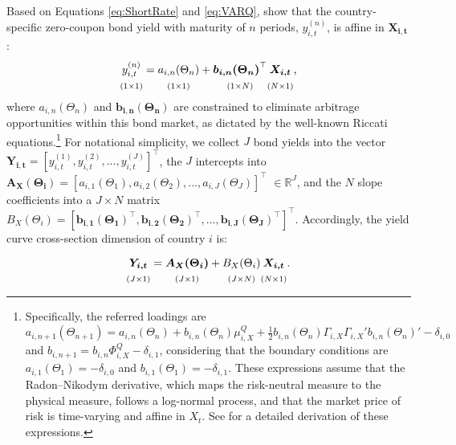 Based on Equations \eqref{eq:ShortRate} and \eqref{eq:VARQ}, \citet{DaiSingleton2000} show that the country-specific zero-coupon bond yield with maturity of \(n\) periods, \(y_{i,t}^{(n)}\), is affine in \(\boldsymbol{X_{i,t}}\):
\begin{equation}
\underset{(1 \times 1)}{\vphantom{\Big|}
y_{i,t}^{(n)}} =
\underset{(1 \times 1)}{\vphantom{\Big|}
a_{i,n}(\Theta_{n})} +
\underset{(1 \times N)}{\vphantom{\Big|}
\boldsymbol{b_{i,n}(\Theta_{n})}^\top}
\underset{(N \times 1)}{\vphantom{\Big|}
\boldsymbol{X_{i,t}}}\text{,}
    \label{eq:AffineYieldsScalar}
\end{equation}
where \(a_{i,n}(\Theta _{n})\) and \(\boldsymbol{b_{i,n}(\Theta _{n})}\) are constrained to eliminate arbitrage opportunities within this bond market, as dictated by the well-known Riccati equations.\footnote{Specifically, the referred loadings are \(a_{i,n+1}(\Theta _{n+1}) = a_{i,n}(\Theta _{n}) + b_{i,n}(\Theta _{n}) \mu^{Q}_{i,X} + \frac{1}{2} b_{i,n}(\Theta _{n}) \Gamma_{i,X} \Gamma_{i,X}' b_{i,n}(\Theta _{n})' - \delta_{i,0}\) and \(b_{i, n+1}=b_{i,n}\Phi^{Q}_{i,X} - \delta_{i,1}\), considering that the boundary conditions are \(a_{i,1}(\Theta _1)=-\delta_{i,0}\) and \(b_{i,1}(\Theta_1)=-\delta_{i,1}\). These expressions assume that the Radon--Nikodym derivative, which maps the risk-neutral measure to the physical measure, follows a log-normal process, and that the market price of risk is time-varying and affine in \(X_t\). See \citet{AngPiazzesi2003} for a detailed derivation of these expressions.} For notational simplicity, we collect \(J\) bond yields into the vector \(\boldsymbol{Y_{i,t}}=[y_{i,t}^{(1)}, y_{i,t}^{(2)},...,y_{i,t}^{(J)}]^\top\), the \(J\) intercepts into \(\boldsymbol{A_X(\Theta_i)}=[a_{i,1}(\Theta _{1}), a_{i,2}(\Theta _{2}) ,...,a_{i,J}(\Theta _{J})]^\top\) \(\in \mathbb{R}^J\), and the \(N\) slope coefficients into a \(J \times N\) matrix \(B_X(\Theta_i)=[\boldsymbol{b_{i,1}(\Theta _{1})}^\top, \boldsymbol{b_{i,2}(\Theta _{2})}^\top, ...,\boldsymbol{b_{i,J}(\Theta _{J})}^\top]^\top\). Accordingly, the yield curve cross-section dimension of country \(i\) is:
\begin{equation}
    \underset{(J \times 1)}{\vphantom{\Big|}
    \boldsymbol{Y_{i,t}}} =
    \underset{(J \times 1)}{\vphantom{\Big|}
    \boldsymbol{A_X(\Theta_i)}} +
    \underset{(J \times N)}{\vphantom{\Big|}
    B_X(\Theta_i)}
    \underset{(N \times 1)}{\vphantom{\Big|}
    \boldsymbol{X_{i,t}}}\text{.}
\label{eq:AffineYieldsVector}
\end{equation}

